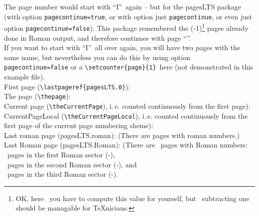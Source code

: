 \documentclass[british]{article}
\begin{document}
The page number would start with
\textquotedblleft I\textquotedblright\ again -- but
for the \textsf{pagesLTS} package (with option \texttt{pagecontinue=true},
or with option just \texttt{pagecontinue}, or even just
 option \texttt{pagecontinue=false}).
This package remembered the
(-1)\footnote{OK, here\ %
you have to compute this value for yourself, but\ %
subtracting one should be managable for \TeX nicians.} pages already
done in Roman output, and therefore continues with page
\textquotedblleft \thepage \textquotedblright .\\
If you want to start with \textquotedblleft I\textquotedblright\ all
over again, you will have two pages with the same name,
but nevertheless you can do this by using option \texttt{pagecontinue=false}
or a \texttt{\textbackslash setcounter\{page\}\{1\}}\ here
(not demonstrated in this example file).\\

\noindent First page (\texttt{\textbackslash lastpageref\{pagesLTS.0\}}):
 \\

\noindent The page (\texttt{\textbackslash thepage}): \thepage \\

\noindent Current page (\texttt{\textbackslash theCurrentPage}),
i.\,e. counted continuously from the first page): \theCurrentPage \\

\noindent CurrentPageLocal (\texttt{\textbackslash theCurrentPageLocal}),
i.\,e. counted continuously from the first page of the
current page numbering sheme): \theCurrentPageLocal \\

\noindent Last roman page (pagesLTS.roman): 
(There are  pages with roman numbers.)\\

\noindent Last Roman page (pagesLTS.Roman): 
(There are ~pages with Roman numbers:\\
~pages in the first Roman sector
(\pageref{Roman}{\hskip3em }-),\\
~pages in the second Roman sector
(\pageref{Roman2}{\hskip3em }-), and\\
~pages in the third Roman sector
(\pageref{Roman3}{\hskip3em }-).\\
\end{document}
